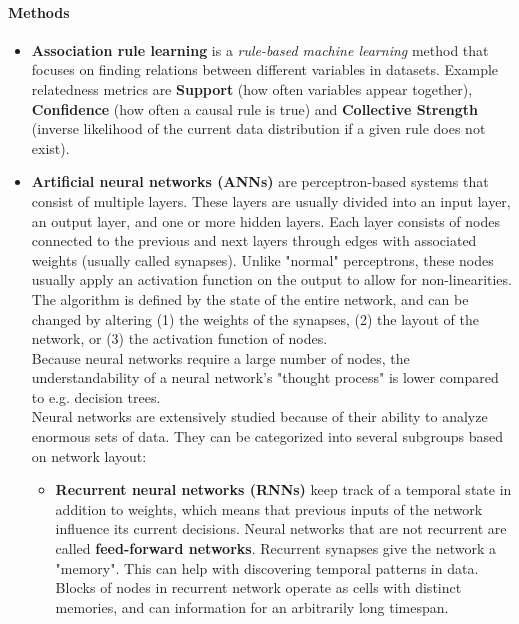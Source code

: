 \paragraph{Methods}
\begin{itemize}
	\item \textbf{Association rule learning}
		is a \textit{rule-based machine learning} method that focuses on finding relations between different variables in datasets. Example relatedness metrics are \textbf{Support} (how often variables appear together), \textbf{Confidence} (how often a causal rule is true) and \textbf{Collective Strength} (inverse likelihood of the current data distribution if a given rule does not exist).
	\item \textbf{Artificial neural networks (ANNs)}
		are perceptron-based systems that consist of multiple layers. These layers are usually divided into an input layer, an output layer, and one or more hidden layers. Each layer consists of nodes connected to the previous and next layers through edges with associated weights (usually called synapses). Unlike "normal" perceptrons, these nodes usually apply an activation function on the output to allow for non-linearities.\\
		The algorithm is defined by the state of the entire network, and can be changed by altering (1) the weights of the synapses, (2) the layout of the network, or (3) the activation function of nodes.\\
		Because neural networks require a large number of nodes, the understandability of a neural network's "thought process" is lower compared to e.g. decision trees.\\
		Neural networks are extensively studied because of their ability to analyze enormous sets of data. They can be categorized into several subgroups based on network layout:
		\begin{itemize}
			\item \textbf{Recurrent neural networks (RNNs)}
				keep track of a temporal state in addition to weights, which means that previous inputs of the network influence its current decisions. Neural networks that are not recurrent are called \textbf{feed-forward networks}. Recurrent synapses give the network a "memory". This can help with discovering temporal patterns in data. Blocks of nodes in recurrent network operate as cells with distinct memories, and can information for an arbitrarily long timespan.

\end{itemize}
\end{itemize}
